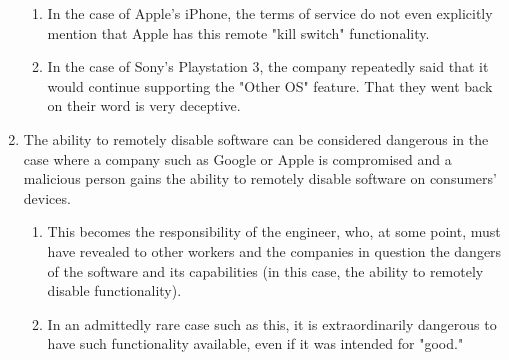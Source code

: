 \documentclass[12pt]{article}
\begin{document}
\begin{enumerate}
\begin{enumerate}
\item In the case of Apple's iPhone, the terms of service do not even explicitly mention that Apple has this remote "kill switch" functionality. \cite{appleTOS}
\item In the case of Sony's Playstation 3, the company repeatedly said that it would continue supporting the "Other OS" feature. That they went back on their word is very deceptive. \cite{sonyLawsuit2}
\end{enumerate}
\item The ability to remotely disable software can be considered dangerous in the case where a company such as Google or Apple is compromised and a malicious person gains the ability to remotely disable software on consumers' devices.
\begin{enumerate}
\item This becomes the responsibility of the engineer, who, at some point, must have revealed to other workers and the companies in question the dangers of the software and its capabilities (in this case, the ability to remotely disable functionality). \cite{secode}
\item In an admittedly rare case such as this, it is extraordinarily dangerous to have such functionality available, even if it was intended for "good."
\end{enumerate}
\end{enumerate}


\newpage




\end{document}
